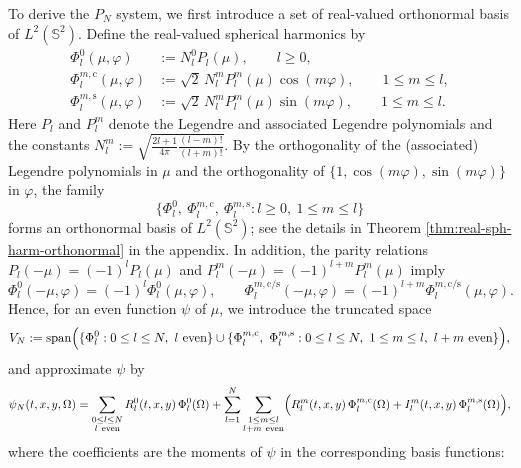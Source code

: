 \documentclass[11pt]{article}
\numberwithin{equation}{section}
\begin{document}
To derive the $P_N$ system, we first introduce a set of real-valued orthonormal basis of $L^2(\mathbb S^2)$. Define the real-valued spherical harmonics by
\begin{align}
\Phi_l^0(\mu,\varphi) &:= N_l^0 P_l(\mu), \qquad l\ge 0, \\
\Phi_l^{m,\mathrm c}(\mu,\varphi) &:= \sqrt{2}\,N_l^m P_l^m(\mu)\cos(m\varphi), \qquad 1\le m\le l, \\
\Phi_l^{m,\mathrm s}(\mu,\varphi) &:= \sqrt{2}\,N_l^m P_l^m(\mu)\sin(m\varphi), \qquad 1\le m\le l.
\end{align}
Here $P_l$ and $P_l^m$ denote the Legendre and associated Legendre polynomials and the constants $N_l^m := \sqrt{\frac{2l+1}{4\pi}\frac{(l-m)!}{(l+m)!}}$. By the orthogonality of the (associated) Legendre polynomials in $\mu$ and the orthogonality of $\{1, \cos(m\varphi), \sin(m\varphi)\}$ in $\varphi$, the family
\begin{equation}
    \bigl\{\Phi_l^0,\ \Phi_l^{m,\mathrm c},\ \Phi_l^{m,\mathrm s}: l\ge 0,\ 1\le m\le l\bigr\}
\end{equation}
forms an orthonormal basis of $L^2(\mathbb S^2)$; see the details in Theorem \ref{thm:real-sph-harm-orthonormal} in the appendix. In addition, the parity relations $P_l(-\mu) = (-1)^l P_l(\mu)$ and $P_l^m(-\mu)=(-1)^{l+m}P_l^m(\mu)$ imply
\begin{equation}
\Phi_l^0(-\mu,\varphi)=(-1)^l\Phi_l^0(\mu,\varphi),
\qquad
\Phi_l^{m,\mathrm c/\mathrm s}(-\mu,\varphi)=(-1)^{l+m}\Phi_l^{m,\mathrm c/\mathrm s}(\mu,\varphi).
\end{equation}
Hence, for an even function $\psi$ of $\mu$, we introduce the truncated space
\begin{equation}
V_N := \mathrm{span}\Bigl(\{\Phi_l^0: 0\le l\le N,\ l\ \text{even}\}
\cup \{\Phi_l^{m,\mathrm c},\ \Phi_l^{m,\mathrm s}: 0\le l\le N,\ 1\le m\le l,\ l+m\ \text{even}\}\Bigr),
\end{equation}
and approximate $\psi$ by
\begin{equation}\label{eq:real-expansion}
\psi_N(t,x,y,\Omega)
=
\sum_{\substack{0\le l\le N \\ l\ \mathrm{even}}} R_l^0(t,x,y)\,\Phi_l^0(\Omega)
+
\sum_{l=1}^N\sum_{\substack{1\le m\le l \\ l+m\ \mathrm{even}}}
\Bigl(
R_l^m(t,x,y)\,\Phi_l^{m,\mathrm c}(\Omega)
+
I_l^m(t,x,y)\,\Phi_l^{m,\mathrm s}(\Omega)
\Bigr),
\end{equation}
where the coefficients are the moments of $\psi$ in the corresponding basis functions:
\end{document}
